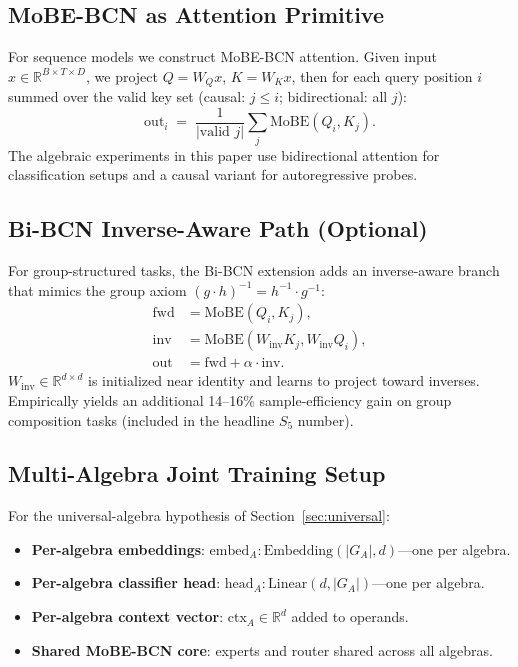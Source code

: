 \documentclass[11pt]{article}
\begin{document}
\subsection{MoBE-BCN as Attention Primitive}

For sequence models we construct MoBE-BCN attention. Given input
$x \in \mathbb{R}^{B \times T \times D}$, we project $Q = W_Q x$,
$K = W_K x$, then for each query position $i$ summed over the valid
key set (causal: $j \leq i$; bidirectional: all $j$):
\begin{equation}
  \text{out}_i \;=\; \frac{1}{|\text{valid } j|} \sum_j \text{MoBE}(Q_i, K_j).
  \label{eq:attn}
\end{equation}
The algebraic experiments in this paper use bidirectional attention
for classification setups and a causal variant for autoregressive
probes.

\subsection{Bi-BCN Inverse-Aware Path (Optional)}

For group-structured tasks, the Bi-BCN extension adds an inverse-aware
branch that mimics the group axiom $(g \cdot h)^{-1} = h^{-1} \cdot g^{-1}$:
\begin{align}
  \text{fwd} &= \text{MoBE}(Q_i, K_j), \\
  \text{inv} &= \text{MoBE}(W_{\mathrm{inv}} K_j, W_{\mathrm{inv}} Q_i), \\
  \text{out} &= \text{fwd} + \alpha \cdot \text{inv}.
\end{align}
$W_{\mathrm{inv}} \in \mathbb{R}^{d \times d}$ is initialized near
identity and learns to project toward inverses. Empirically yields an
additional 14--16\% sample-efficiency gain on group composition tasks
(included in the headline $S_5$ number).

\subsection{Multi-Algebra Joint Training Setup}
\label{sec:multi-algebra-setup}

For the universal-algebra hypothesis of Section~\ref{sec:universal}:
\begin{itemize}
\item \textbf{Per-algebra embeddings}: $\text{embed}_A : \text{Embedding}(|G_A|, d)$---one per algebra.
\item \textbf{Per-algebra classifier head}: $\text{head}_A : \text{Linear}(d, |G_A|)$---one per algebra.
\item \textbf{Per-algebra context vector}: $\text{ctx}_A \in \mathbb{R}^d$ added to operands.
\item \textbf{Shared MoBE-BCN core}: experts and router shared across all algebras.
\end{itemize}
\end{document}
